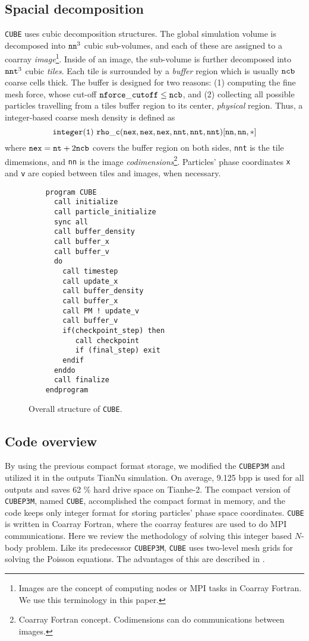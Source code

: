 \documentclass[10pt,twocolumn,preprint]{emulateapj}
\begin{document}
\subsection{Spacial decomposition}
{\tt CUBE} uses cubic decomposition structures. The global simulation volume is decomposed into ${\tt nn}^3$ cubic sub-volumes, and each of these are assigned to a coarray {\it image}\footnote{Images are the concept of computing nodes or MPI tasks in Coarray Fortran. We use this terminology in this paper.}. Inside of an image, the sub-volume is further decomposed into ${\tt nnt}^3$ cubic {\it tiles}. Each tile is surrounded by a {\it buffer} region which is usually ${\tt ncb}$ coarse cells thick. The buffer is designed for two reasons: (1) computing the fine mesh force, whose cut-off ${\tt nforce\_cutoff}\leq{\tt ncb}$, and (2) collecting all possible particles travelling from a tiles buffer region to its center, {\it physical} region. Thus, a integer-based coarse mesh density is defined as
\begin{equation*}
{\tt integer(1)\ rho\_c(nex,nex,nex,nnt,nnt,nnt)[nn,nn,*]}\\
\end{equation*}
where ${\tt nex}={\tt nt}+2{\tt ncb}$ covers the buffer region on both sides, {\tt nnt} is the tile dimemsions, and {\tt nn} is the image {\it codimensions}\footnote{Coarray Fortran concept. Codimensions can do communications between images.}. Particles' phase coordinates {\tt x} and {\tt v} are copied between tiles and images, when necessary.
\begin{figure}[h]
\begin{verbatim}
    program CUBE
      call initialize
      call particle_initialize
      sync all
      call buffer_density
      call buffer_x
      call buffer_v
      do
        call timestep
        call update_x
        call buffer_density
        call buffer_x
        call PM ! update_v
        call buffer_v
        if(checkpoint_step) then
           call checkpoint
           if (final_step) exit
        endif
      enddo
      call finalize
    endprogram
\end{verbatim}
\caption{Overall structure of {\tt CUBE}.}
\label{fig.code}
\end{figure}

\subsection{Code overview}
By using the previous compact format storage, we modified the {\tt CUBEP3M} and utilized it in the outputs TianNu simulation. On average, 9.125 bpp is used for all outputs and saves 62 \% hard drive space on Tianhe-2. The compact version of {\tt CUBEP3M}, named {\tt CUBE}, accomplished the compact format in memory, and the code keeps only integer format for storing particles' phase space coordinates. {\tt CUBE} is written in Coarray Fortran, where the coarray features are used to do MPI communications. Here we review the methodology of solving this integer based $N$-body problem. Like its predecessor {\tt CUBEP3M}, {\tt CUBE} uses two-level mesh grids for solving the Poisson equations. The advantages of this are described in \cite{2013MNRAS.436..540H}.
\end{document}
